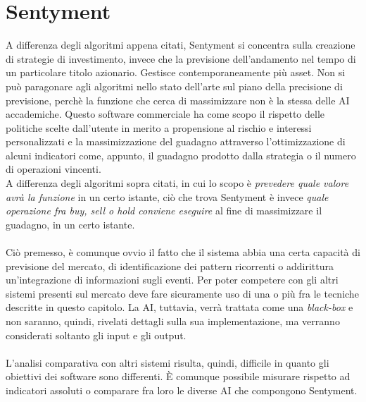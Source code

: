 \documentclass[a4paper,12pt]{report}
\begin{document}
\newpage
\section{Sentyment}
A differenza degli algoritmi appena citati, Sentyment si concentra sulla creazione di strategie di investimento, invece che la previsione dell'andamento nel tempo di un particolare titolo azionario. Gestisce contemporaneamente più asset. Non si può paragonare agli algoritmi nello stato dell'arte sul piano della precisione di previsione, perchè la funzione che cerca di massimizzare non è la stessa delle AI accademiche. Questo software commerciale ha come scopo il rispetto delle politiche scelte dall'utente in merito a propensione al rischio e interessi personalizzati e la massimizzazione del guadagno attraverso l'ottimizzazione di alcuni indicatori come, appunto, il guadagno prodotto dalla strategia o il numero di operazioni vincenti.\\ A differenza degli algoritmi sopra citati, in cui lo scopo è \textit{prevedere quale valore avrà la funzione} in un certo istante, ciò che trova Sentyment è invece \textit{quale operazione fra buy, sell o hold conviene eseguire} al fine di massimizzare il guadagno, in un certo istante.\\~\\
Ciò premesso, è comunque ovvio il fatto che il sistema abbia una certa capacità di previsione del mercato, di identificazione dei pattern ricorrenti o addirittura un'integrazione di informazioni sugli eventi. Per poter competere con gli altri sistemi presenti sul mercato deve fare sicuramente uso di una o più fra le tecniche descritte in questo capitolo. La AI, tuttavia, verrà trattata come una \textit{black-box} e non saranno, quindi, rivelati dettagli sulla sua implementazione, ma verranno considerati soltanto gli input e gli output.\\~\\ L'analisi comparativa con altri sistemi risulta, quindi, difficile in quanto gli obiettivi dei software sono differenti. È comunque possibile misurare rispetto ad indicatori assoluti o comparare fra loro le diverse AI che compongono Sentyment.
\end{document}
